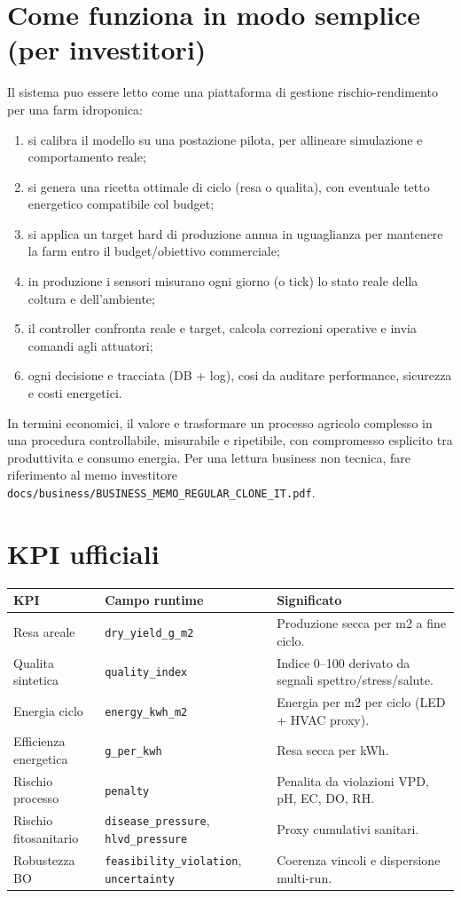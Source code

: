 ﻿\documentclass[11pt,a4paper]{report}
\begin{document}
\section{Come funziona in modo semplice (per investitori)}
Il sistema puo essere letto come una piattaforma di gestione rischio-rendimento per una farm idroponica:
\begin{enumerate}
  \item si calibra il modello su una postazione pilota, per allineare simulazione e comportamento reale;
  \item si genera una ricetta ottimale di ciclo (resa o qualita), con eventuale tetto energetico compatibile col budget;
  \item si applica un target hard di produzione annua in uguaglianza per mantenere la farm entro il budget/obiettivo commerciale;
  \item in produzione i sensori misurano ogni giorno (o tick) lo stato reale della coltura e dell'ambiente;
  \item il controller confronta reale e target, calcola correzioni operative e invia comandi agli attuatori;
  \item ogni decisione e tracciata (DB + log), cosi da auditare performance, sicurezza e costi energetici.
\end{enumerate}
In termini economici, il valore e trasformare un processo agricolo complesso in una procedura controllabile,
misurabile e ripetibile, con compromesso esplicito tra produttivita e consumo energia.
Per una lettura business non tecnica, fare riferimento al memo investitore \texttt{docs/business/BUSINESS\_MEMO\_REGULAR\_CLONE\_IT.pdf}.

\section{KPI ufficiali}
\begin{longtable}{@{}p{4.0cm}p{4.0cm}p{5.8cm}@{}}
\toprule
KPI & Campo runtime & Significato \\ \midrule
Resa areale & \texttt{dry\_yield\_g\_m2} & Produzione secca per m2 a fine ciclo. \\
Qualita sintetica & \texttt{quality\_index} & Indice 0--100 derivato da segnali spettro/stress/salute. \\
Energia ciclo & \texttt{energy\_kwh\_m2} & Energia per m2 per ciclo (LED + HVAC proxy). \\
Efficienza energetica & \texttt{g\_per\_kwh} & Resa secca per kWh. \\
Rischio processo & \texttt{penalty} & Penalita da violazioni VPD, pH, EC, DO, RH. \\
Rischio fitosanitario & \texttt{disease\_pressure}, \texttt{hlvd\_pressure} & Proxy cumulativi sanitari. \\
Robustezza BO & \texttt{feasibility\_violation}, \texttt{uncertainty} & Coerenza vincoli e dispersione multi-run. \\
\bottomrule
\end{longtable}
\end{document}
